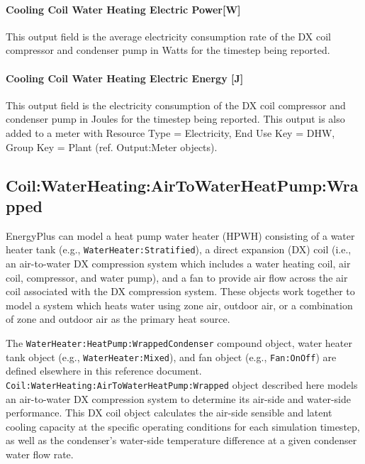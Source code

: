 \paragraph{Cooling Coil Water Heating Electric Power{[}W{]}}\label{cooling-coil-water-heating-electric-powerw}

This output field is the average electricity consumption rate of the DX coil compressor and condenser pump in Watts for the timestep being reported.

\paragraph{Cooling Coil Water Heating Electric Energy {[}J{]}}\label{cooling-coil-water-heating-electric-energy-j}

This output field is the electricity consumption of the DX coil compressor and condenser pump in Joules for the timestep being reported. This output is also added to a meter with Resource Type = Electricity, End Use Key = DHW, Group Key = Plant (ref. Output:Meter objects).

\subsection{Coil:WaterHeating:AirToWaterHeatPump:Wrapped}\label{coilwaterheatingairtowaterheatpumpwrapped}

EnergyPlus can model a heat pump water heater (HPWH) consisting of a water heater tank (e.g., \lstinline!WaterHeater:Stratified!), a direct expansion (DX) coil (i.e., an air-to-water DX compression system which includes a water heating coil, air coil, compressor, and water pump), and a fan to provide air flow across the air coil associated with the DX compression system. These objects work together to model a system which heats water using zone air, outdoor air, or a combination of zone and outdoor air as the primary heat source.

The \lstinline!WaterHeater:HeatPump:WrappedCondenser! compound object, water heater tank object (e.g., \lstinline!WaterHeater:Mixed!), and fan object (e.g., \lstinline!Fan:OnOff!) are defined elsewhere in this reference document. \lstinline!Coil:WaterHeating:AirToWaterHeatPump:Wrapped! object described here models an air-to-water DX compression system to determine its air-side and water-side performance. This DX coil object calculates the air-side sensible and latent cooling capacity at the specific operating conditions for each simulation timestep, as well as the condenser's water-side temperature difference at a given condenser water flow rate.

